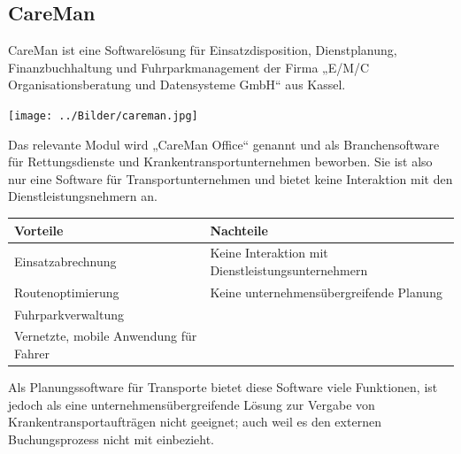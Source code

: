 \documentclass[a4paper, ngerman, 12pt]{scrartcl}
\begin{document}
\subsection{CareMan}
CareMan ist eine Softwarelösung für Einsatzdisposition, Dienstplanung, Finanzbuchhaltung und Fuhrparkmanagement der Firma „E/M/C Organisationsberatung und Datensysteme GmbH“ aus Kassel.
\begin{center}
\begin{minipage}{0.8\textwidth}
	\centering
	\texttt{[image: ../Bilder/careman.jpg]}
	\label{img:careman}
\end{minipage}
\end{center}
Das relevante Modul wird „CareMan Office“ genannt und als Branchensoftware für Rettungsdienste und Krankentransportunternehmen beworben. Sie ist also nur eine Software für Transportunternehmen und bietet keine Interaktion mit den Dienstleistungsnehmern an.
\begin{center}
\begin{tabular}{|p{}|p{}|}
\hline
\cellcolor{lightgray}\textbf{Vorteile}	&\cellcolor{lightgray}\textbf{Nachteile}\\
\hline
Einsatzabrechnung	&Keine Interaktion mit Dienstleistungsunternehmern\\
\hline
Routenoptimierung	&Keine unternehmensübergreifende Planung\\
\hline
Fuhrparkverwaltung	&\\
\hline
Vernetzte, mobile Anwendung für Fahrer	&\\
\hline
\end{tabular}
\end{center}
Als Planungssoftware für Transporte bietet diese Software viele Funktionen, ist jedoch als eine unternehmensübergreifende Lösung zur Vergabe von Krankentransportaufträgen nicht geeignet; auch weil es den externen Buchungsprozess nicht mit einbezieht.
\end{document}
